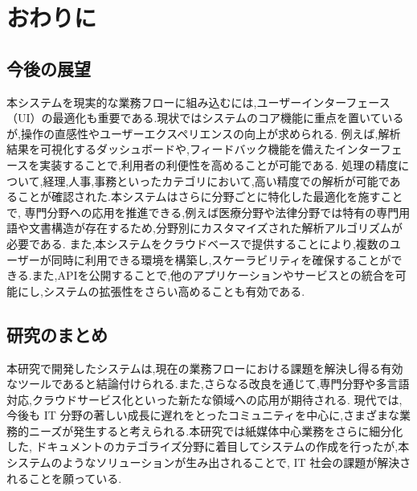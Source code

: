 \chapter{おわりに}
\label{ch:con}

\quad

\section{今後の展望}
\label{sec:con_future}

本システムを現実的な業務フローに組み込むには,ユーザーインターフェース（UI）の最適化も重要である.現状ではシステムのコア機能に重点を置いているが,操作の直感性やユーザーエクスペリエンスの向上が求められる.
例えば,解析結果を可視化するダッシュボードや,フィードバック機能を備えたインターフェースを実装することで,利用者の利便性を高めることが可能である.
処理の精度について,経理,人事,事務といったカテゴリにおいて,高い精度での解析が可能であることが確認された.本システムはさらに分野ごとに特化した最適化を施すことで,
専門分野への応用を推進できる,例えば医療分野や法律分野では特有の専門用語や文書構造が存在するため,分野別にカスタマイズされた解析アルゴリズムが必要である.
また,本システムをクラウドベースで提供することにより,複数のユーザーが同時に利用できる環境を構築し,スケーラビリティを確保することができる.また,APIを公開することで,他のアプリケーションやサービスとの統合を可能にし,システムの拡張性をさらい高めることも有効である.

\section{研究のまとめ}
\label{sec:con_fin}

本研究で開発したシステムは,現在の業務フローにおける課題を解決し得る有効なツールであると結論付けられる.また,さらなる改良を通じて,専門分野や多言語対応,クラウドサービス化といった新たな領域への応用が期待される.
現代では,今後も IT 分野の著しい成長に遅れをとったコミュニティを中心に,さまざまな業務的ニーズが発生すると考えられる.本研究では紙媒体中心業務をさらに細分化した,
ドキュメントのカテゴライズ分野に着目してシステムの作成を行ったが,本システムのようなソリューションが生み出されることで, IT 社会の課題が解決されることを願っている.
